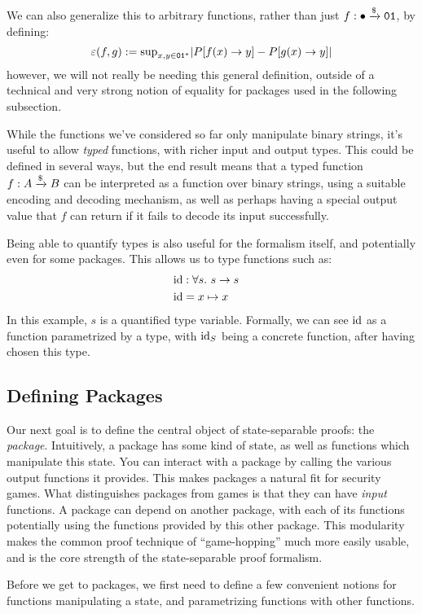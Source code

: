 We can also generalize this to arbitrary functions, rather than just
$f : \bullet \xrightarrow{\$} \texttt{01}$, by defining:
$$
\varepsilon(f, g) := \text{sup}_{x, y \in \texttt{01}^*} |P[f(x) \to y] - P[g(x) \to y]|
$$
however, we will not really be needing this general definition, outside
of a technical and very strong notion of equality for packages
used in the following subsection.

While the functions we've considered so far only manipulate binary strings,
it's useful to allow \emph{typed} functions,
with richer input and output types.
This could be defined in several ways, but the end result means
that a typed function $f : A \xrightarrow{\$} B$ can be interpreted as a function
over binary strings, using a suitable encoding and decoding mechanism,
as well as perhaps having a special output value that $f$ can return
if it fails to decode its input successfully.

Being able to quantify types is also useful for the formalism itself,
and potentially even for some packages.
This allows us to type functions such as:
$$
\begin{aligned}
    &\text{id} : \forall s.\ s \to s\cr
    &\text{id} = x \mapsto x
\end{aligned}
$$
In this example, $s$ is a quantified type variable.
Formally, we can see $\text{id}$ as a function parametrized by a type,
with $\text{id}_S$ being a concrete function, after having chosen this type.

\subsection{Defining Packages}

Our next goal is to define the central object of state-separable proofs:
the \emph{package}.
Intuitively, a package has some kind of state, as well as functions
which manipulate this state.
You can interact with a package by calling the various output functions
it provides.
This makes packages a natural fit for security games.
What distinguishes packages from games is that they can have \emph{input}
functions.
A package can depend on another package, with each of its functions
potentially using the functions provided by this other package.
This modularity makes the common proof technique of ``game-hopping''
much more easily usable, and is the core strength of the state-separable
proof formalism.

Before we get to packages, we first need to define a few convenient
notions for functions manipulating a state, and parametrizing
functions with other functions.

